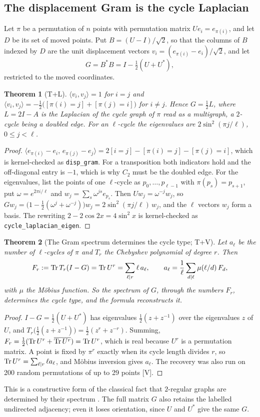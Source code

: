 \documentclass[11pt]{article}
\newtheorem{theorem}{Theorem}\newtheorem{proposition}[theorem]{Proposition}\newtheorem{corollary}[theorem]{Corollary}
\theoremstyle{remark}\newtheorem{remark}[theorem]{Remark}
\begin{document}
\subsection{The displacement Gram is the cycle Laplacian}
Let $\pi$ be a permutation of $n$ points with permutation matrix $Ue_i=e_{\pi(i)}$, and let $D$ be its set of moved points. Put $B=(U-I)/\sqrt2$, so that the columns of $B$ indexed by $D$ are the unit displacement vectors $v_i=(e_{\pi(i)}-e_i)/\sqrt2$, and let
\[
G=B^*B=I-\tfrac12(U+U^*),
\]
restricted to the moved coordinates.
\begin{theorem}[T+L]\label{thm:gram}
$\langle v_i,v_j\rangle=1$ for $i=j$ and $\langle v_i,v_j\rangle=-\tfrac12\big([\pi(i)=j]+[\pi(j)=i]\big)$ for $i\ne j$. Hence $G=\tfrac12L$, where $L=2I-A$ is the Laplacian of the cycle graph of $\pi$ read as a multigraph, a $2$-cycle being a doubled edge. For an $\ell$-cycle the eigenvalues are $2\sin^2(\pi j/\ell)$, $0\le j<\ell$.
\end{theorem}
\begin{proof}
$\langle e_{\pi(i)}-e_i,\,e_{\pi(j)}-e_j\rangle=2[i=j]-[\pi(i)=j]-[\pi(j)=i]$, which is kernel-checked as \texttt{disp\_gram}. For a transposition both indicators hold and the off-diagonal entry is $-1$, which is why $C_2$ must be the doubled edge. For the eigenvalues, list the points of one $\ell$-cycle as $p_0,\dots,p_{\ell-1}$ with $\pi(p_s)=p_{s+1}$, put $\omega=e^{2\pi i/\ell}$ and $w_j=\sum_s\omega^{js}e_{p_s}$. Then $Uw_j=\omega^{-j}w_j$, so $Gw_j=\big(1-\tfrac12(\omega^j+\omega^{-j})\big)w_j=2\sin^2(\pi j/\ell)\,w_j$, and the $\ell$ vectors $w_j$ form a basis. The rewriting $2-2\cos2x=4\sin^2x$ is kernel-checked as \texttt{cycle\_laplacian\_eigen}.
\end{proof}
\begin{theorem}[The Gram spectrum determines the cycle type; T+V]\label{thm:cycletype}
Let $a_\ell$ be the number of $\ell$-cycles of $\pi$ and $T_r$ the Chebyshev polynomial of degree $r$. Then
\[
F_r:=\operatorname{Tr} T_r(I-G)=\operatorname{Tr} U^r=\sum_{\ell\mid r}\ell\,a_\ell,\qquad a_\ell=\frac1\ell\sum_{d\mid\ell}\mu(\ell/d)\,F_d,
\]
with $\mu$ the M\"obius function. So the spectrum of $G$, through the numbers $F_r$, determines the cycle type, and the formula reconstructs it.
\end{theorem}
\begin{proof}
$I-G=\tfrac12(U+U^*)$ has eigenvalues $\tfrac12(z+z^{-1})$ over the eigenvalues $z$ of $U$, and $T_r\big(\tfrac12(z+z^{-1})\big)=\tfrac12(z^r+z^{-r})$. Summing, $F_r=\tfrac12(\operatorname{Tr} U^r+\overline{\operatorname{Tr} U^r})=\operatorname{Tr} U^r$, which is real because $U^r$ is a permutation matrix. A point is fixed by $\pi^r$ exactly when its cycle length divides $r$, so $\operatorname{Tr} U^r=\sum_{\ell\mid r}\ell a_\ell$, and M\"obius inversion gives $a_\ell$. The recovery was also run on 200 random permutations of up to 29 points [V].
\end{proof}
This is a constructive form of the classical fact that $2$-regular graphs are determined by their spectrum \cite{DS}. The full matrix $G$ also retains the labelled undirected adjacency; even it loses orientation, since $U$ and $U^*$ give the same $G$.
\end{document}
